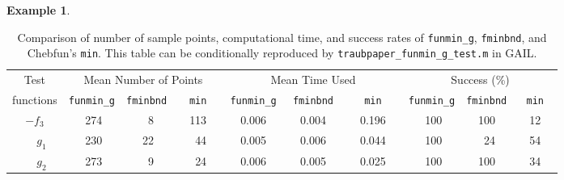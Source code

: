 \documentclass[review]{elsarticle}
\theoremstyle{definition}
\newtheorem{exmp}{Example}
\newcommand{\funming}{\texttt{funmin\_g\xspace}}
\newcommand{\fminbnd}{\texttt{fminbnd\xspace}}
\begin{document}
\begin{exmp}
%
\begin{table}[tb]
	\centering
	\caption{Comparison of number of sample points, computational time,  and success
		rates of \funming, \fminbnd, and
		Chebfun's \texttt{min}.
		This table can be conditionally reproduced by
		\texttt{traubpaper\_funmin\_g\_test.m} in GAIL.}
	\label{tab:funmingVsfminbndVsChebfun}
	{\footnotesize

	\setlength{\tabcolsep}{.3em}
		\begin{tabular}{ccrccrccrccrccrccrccrccrccrc}		
			Test      &    \multicolumn{9}{c}{Mean Number of Points}   & \multicolumn{9}{c}{Mean Time Used}  & \multicolumn{9}{c}{Success (\%)}
			\\  functions &  \multicolumn{3}{c}{\funming} &  \multicolumn{3}{c}{\fminbnd}  &  \multicolumn{3}{c}{\texttt{min}}  
		  &  \multicolumn{3}{c}{\funming}  &  \multicolumn{3}{c}{\fminbnd }  &  \multicolumn{3}{c}{\texttt{min} }  &  \multicolumn{3}{c}{\funming} & \multicolumn{3}{c}{\fminbnd} & \multicolumn{3}{c}{\texttt{min}}
			\\ \toprule
			$-f_3$   &&  274   &&&   8   &&&  113     &&&   0.006   &&&   0.004    &&& 0.196  &&&   100   &&&  100   &&&  12 
			\\ $\phantom{-}g_1$   && 230 &&&  22   &&&    44    &&& 0.005  &&&    0.006   &&&  0.044 &&&    100   &&&   24   &&&  54 
			\\ $\phantom{-}g_2$   &&  273 &&&   9   &&&   24    &&&  0.006   &&&   0.005    &&&  0.025 &&&    100   &&& 100   &&&  34 
		\end{tabular}
	}
\end{table}
%


\end{exmp}
\end{document}

